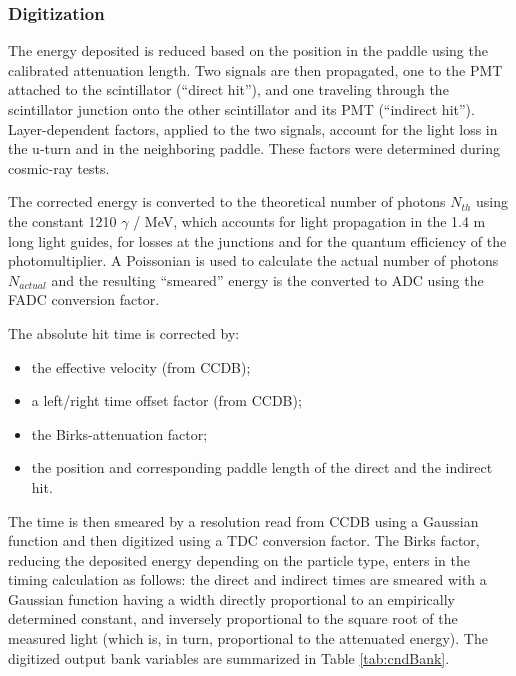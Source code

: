 \subsubsection{Digitization}

The energy deposited is reduced based on the position in the paddle using the calibrated attenuation length.
Two signals are then propagated, one to the PMT attached to the scintillator (``direct hit''), and one traveling through the scintillator junction
onto the other scintillator and its PMT (``indirect hit'').
Layer-dependent factors, applied to the two  signals, account for the light loss in the u-turn and in the neighboring paddle.
These factors were determined during cosmic-ray tests.

The corrected energy is converted to the theoretical number of photons $N_{th}$ using the constant 1210 $\gamma$ / MeV, which accounts for light
propagation in the 1.4 m long light guides, for losses at the junctions and for the quantum efficiency of the photomultiplier.
A Poissonian is used to
calculate the actual number of photons $N_{actual}$ and the resulting ``smeared'' energy is the converted to ADC using the FADC conversion factor.

The absolute hit time is corrected by:

\begin{itemize}
	\item the effective velocity (from CCDB);
	\item a left/right time offset factor (from CCDB);
	\item the Birks-attenuation factor;
	\item the position and corresponding paddle length of the direct and the indirect hit.
\end{itemize}

The time is then smeared by a resolution read from CCDB using a Gaussian function and then digitized using a TDC conversion factor.
The Birks factor, reducing the deposited
energy depending on the particle type, enters in the timing calculation as
follows: the direct and indirect times are smeared with a Gaussian
function having a width directly proportional to an empirically determined
constant, and inversely proportional to the square root of the measured
light (which is, in turn, proportional to the attenuated energy).
The digitized output bank variables are summarized in Table \ref{tab:cndBank}.

